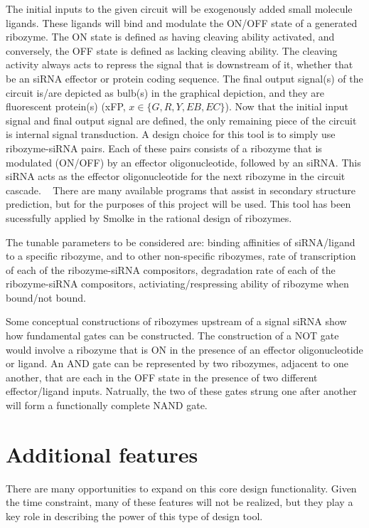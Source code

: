 \documentclass[11pt]{article}
\newcommand{\MYhref}[3][blue]{\href{#2}{\color{#1}{#3}}}%
\begin{document}
The initial inputs to the given circuit will be exogenously added small molecule ligands.
These ligands will bind and modulate the ON/OFF state of a generated ribozyme. The ON 
state is defined as having cleaving ability activated, and conversely, the OFF state is defined
as lacking cleaving ability. The cleaving activity always acts to repress the signal that is downstream of
it, whether that be an siRNA effector or protein coding sequence. The final output signal(s) of the 
circuit  is/are depicted as bulb(s) in the graphical depiction, and they are fluorescent protein(s)
 (xFP, $x\in\{G,R,Y,EB,EC\}$). Now that the initial input signal and final output signal are defined,
the only remaining piece of the circuit is internal signal transduction. A design choice for this tool
is to simply use ribozyme-siRNA pairs. Each of these pairs consists of a ribozyme that is modulated (ON/OFF)
by an effector oligonucleotide, followed by an siRNA. This siRNA acts as the effector oligonucleotide for the 
next ribozyme in the circuit cascade. ~\cite{state_effector} There are many available programs that
assist in secondary structure prediction, but for the purposes of this project 
\MYhref{http://rna.urmc.rochester.edu/rnastructure.html}{RNAstructure v.5.3} 
will be used. This tool has been sucessfully applied by Smolke in the rational design of ribozymes.

The tunable parameters to  be considered are: binding affinities of siRNA/ligand
to a specific ribozyme, and to other non-specific ribozymes, rate of transcription of each 
of the ribozyme-siRNA compositors, degradation rate of each of the ribozyme-siRNA compositors,
activiating/respressing ability of ribozyme when bound/not bound.

Some conceptual constructions of ribozymes upstream of a signal siRNA show how fundamental gates 
can be constructed. The construction of a NOT gate would involve a ribozyme that is ON in 
the presence of an effector oligonucleotide or ligand. An AND gate can be represented
by two ribozymes, adjacent to one another, that are each in the OFF state in the presence of 
two different effector/ligand inputs. Natrually, the two of these gates strung one after another 
will form a functionally complete NAND gate.  

\section*{Additional features}

There are many opportunities to expand on this core design functionality. Given the time
constraint, many of these features will not be realized, but they play a key 
role in describing the power of this type of design tool.
 
\end{document}

